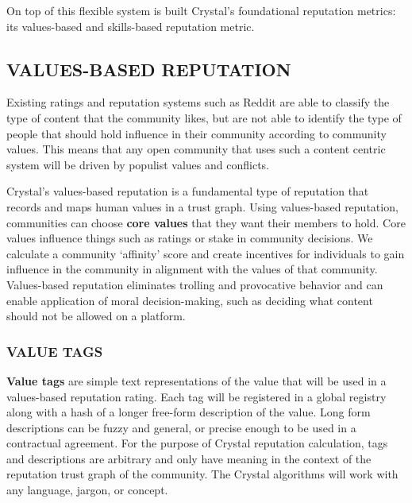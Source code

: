 On top of this flexible system is built Crystal's foundational
reputation metrics: its values-based and skills-based reputation metric.

\subsection{\texorpdfstring{\protect\hypertarget{_4wg2txeesr4f}{}{\protect\hypertarget{_Toc462050409}{}{}}VALUES-BASED
REPUTATION}{VALUES-BASED REPUTATION}}\label{values-based-reputation}

Existing ratings and reputation systems such as Reddit are able to
classify the type of content that the community likes, but are not able
to identify the type of people that should hold influence in their
community according to community values. This means that any open
community that uses such a content centric system will be driven by
populist values and conflicts.

Crystal's values-based reputation is a fundamental type of reputation
that records and maps human values in a trust graph. Using values-based
reputation, communities can choose \textbf{core values} that they want
their members to hold. Core values influence things such as ratings or
stake in community decisions. We calculate a community `affinity' score
and create incentives for individuals to gain influence in the community
in alignment with the values of that community. Values-based reputation
eliminates trolling and provocative behavior and can enable application
of moral decision-making, such as deciding what content should not be
allowed on a platform.

\subsubsection{\texorpdfstring{\protect\hypertarget{_pa238j7lw1k0}{}{\protect\hypertarget{_Toc462050410}{}{}}VALUE
TAGS}{VALUE TAGS}}\label{value-tags}

\textbf{Value tags} are simple text representations of the value that
will be used in a values-based reputation rating. Each tag will be
registered in a global registry along with a hash of a longer free-form
description of the value. Long form descriptions can be fuzzy and
general, or precise enough to be used in a contractual agreement. For
the purpose of Crystal reputation calculation, tags and descriptions are
arbitrary and only have meaning in the context of the reputation trust
graph of the community. The Crystal algorithms will work with any
language, jargon, or concept.

